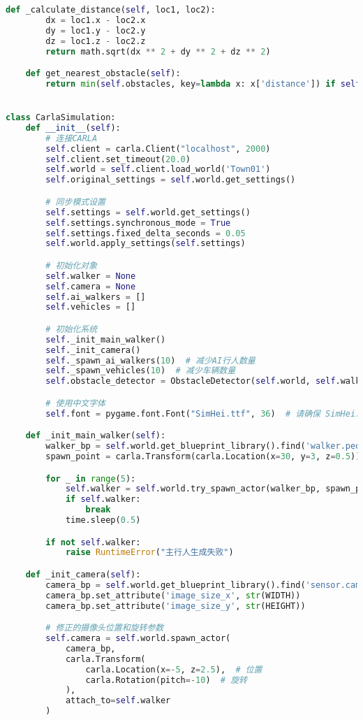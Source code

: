\begin{lstlisting}[language=Python]
    def _calculate_distance(self, loc1, loc2):
        dx = loc1.x - loc2.x
        dy = loc1.y - loc2.y
        dz = loc1.z - loc2.z
        return math.sqrt(dx ** 2 + dy ** 2 + dz ** 2)

    def get_nearest_obstacle(self):
        return min(self.obstacles, key=lambda x: x['distance']) if self.obstacles else None


class CarlaSimulation:
    def __init__(self):
        # 连接CARLA
        self.client = carla.Client("localhost", 2000)
        self.client.set_timeout(20.0)
        self.world = self.client.load_world('Town01')
        self.original_settings = self.world.get_settings()

        # 同步模式设置
        self.settings = self.world.get_settings()
        self.settings.synchronous_mode = True
        self.settings.fixed_delta_seconds = 0.05
        self.world.apply_settings(self.settings)

        # 初始化对象
        self.walker = None
        self.camera = None
        self.ai_walkers = []
        self.vehicles = []

        # 初始化系统
        self._init_main_walker()
        self._init_camera()
        self._spawn_ai_walkers(10)  # 减少AI行人数量
        self._spawn_vehicles(10)  # 减少车辆数量
        self.obstacle_detector = ObstacleDetector(self.world, self.walker)

        # 使用中文字体
        self.font = pygame.font.Font("SimHei.ttf", 36)  # 请确保 SimHei.ttf 字体文件存在

    def _init_main_walker(self):
        walker_bp = self.world.get_blueprint_library().find('walker.pedestrian.0001')
        spawn_point = carla.Transform(carla.Location(x=30, y=3, z=0.5))

        for _ in range(5):
            self.walker = self.world.try_spawn_actor(walker_bp, spawn_point)
            if self.walker:
                break
            time.sleep(0.5)

        if not self.walker:
            raise RuntimeError("主行人生成失败")

    def _init_camera(self):
        camera_bp = self.world.get_blueprint_library().find('sensor.camera.rgb')
        camera_bp.set_attribute('image_size_x', str(WIDTH))
        camera_bp.set_attribute('image_size_y', str(HEIGHT))

        # 修正的摄像头位置和旋转参数
        self.camera = self.world.spawn_actor(
            camera_bp,
            carla.Transform(
                carla.Location(x=-5, z=2.5),  # 位置
                carla.Rotation(pitch=-10)  # 旋转
            ),
            attach_to=self.walker
        )


\end{lstlisting}

